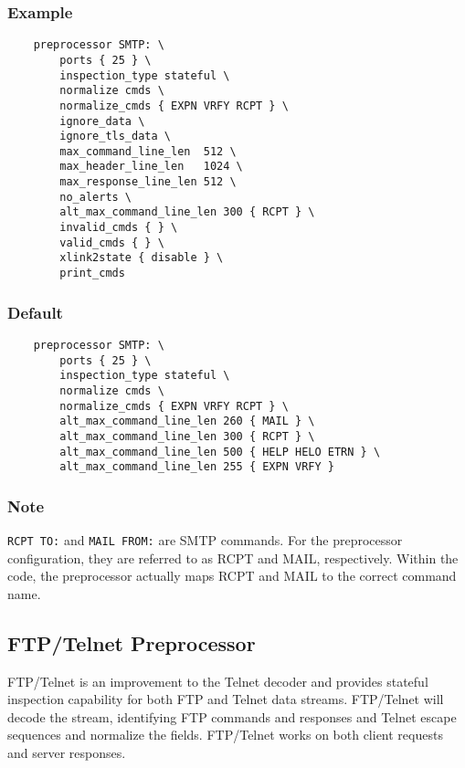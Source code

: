 \documentclass[english]{report}
\begin{document}
\subsubsection{Example}

\begin{verbatim}
    preprocessor SMTP: \
        ports { 25 } \
        inspection_type stateful \
        normalize cmds \
        normalize_cmds { EXPN VRFY RCPT } \
        ignore_data \
        ignore_tls_data \
        max_command_line_len  512 \
        max_header_line_len   1024 \
        max_response_line_len 512 \
        no_alerts \
        alt_max_command_line_len 300 { RCPT } \
        invalid_cmds { } \
        valid_cmds { } \
        xlink2state { disable } \
        print_cmds
\end{verbatim}

\subsubsection{Default}

\begin{verbatim}
    preprocessor SMTP: \
        ports { 25 } \
        inspection_type stateful \
        normalize cmds \
        normalize_cmds { EXPN VRFY RCPT } \
        alt_max_command_line_len 260 { MAIL } \
        alt_max_command_line_len 300 { RCPT } \
        alt_max_command_line_len 500 { HELP HELO ETRN } \
        alt_max_command_line_len 255 { EXPN VRFY }
\end{verbatim}

\subsubsection{Note}

\texttt{RCPT TO:} and \texttt{MAIL FROM:} are SMTP commands.  For the
preprocessor configuration, they are referred to as RCPT and MAIL,
respectively.  Within the code, the preprocessor actually maps RCPT and MAIL to
the correct command name.

\subsection{FTP/Telnet Preprocessor}
\label{sub:ftptelnet}

FTP/Telnet is an improvement to the Telnet decoder and provides stateful
inspection capability for both FTP and Telnet data streams.  FTP/Telnet will
decode the stream, identifying FTP commands and responses and Telnet escape
sequences and normalize the fields.  FTP/Telnet works on both client requests
and server responses.
\end{document}
